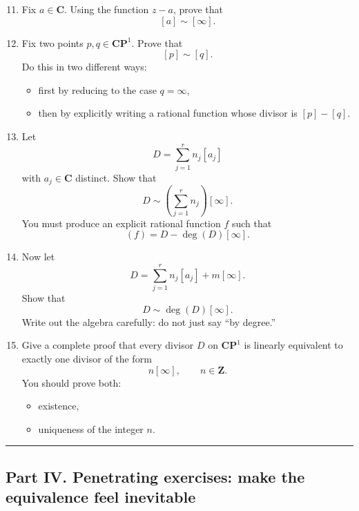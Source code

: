 \documentclass[11pt,openany]{article}
\begin{document}
\begin{enumerate}
	\setcounter{enumi}{10}
	
	\item Fix \(a\in\mathbf{C}\). Using the function \(z-a\), prove that
	\[
	[a]\sim [\infty].
	\]
	
	\item Fix two points \(p,q\in \mathbf{CP}^1\). Prove that
	\[
	[p]\sim [q].
	\]
	Do this in two different ways:
	\begin{itemize}
		\item first by reducing to the case \(q=\infty\),
		\item then by explicitly writing a rational function whose divisor is \([p]-[q]\).
	\end{itemize}
	
	\item Let
	\[
	D=\sum_{j=1}^r n_j[a_j]
	\]
	with \(a_j\in \mathbf{C}\) distinct. Show that
	\[
	D\sim \left(\sum_{j=1}^r n_j\right)[\infty].
	\]
	You must produce an explicit rational function \(f\) such that
	\[
	(f)=D-\deg(D)[\infty].
	\]
	
	\item Now let
	\[
	D=\sum_{j=1}^r n_j[a_j]+m[\infty].
	\]
	Show that
	\[
	D\sim \deg(D)[\infty].
	\]
	Write out the algebra carefully: do not just say ``by degree.''
	
	\item Give a complete proof that every divisor \(D\) on \(\mathbf{CP}^1\) is linearly equivalent to exactly one divisor of the form
	\[
	n[\infty], \qquad n\in\mathbf{Z}.
	\]
	You should prove both:
	\begin{itemize}
		\item existence,
		\item uniqueness of the integer \(n\).
	\end{itemize}
\end{enumerate}

\bigskip
\hrule
\bigskip

\subsection*{Part IV. Penetrating exercises: make the equivalence feel inevitable}
\end{document}
